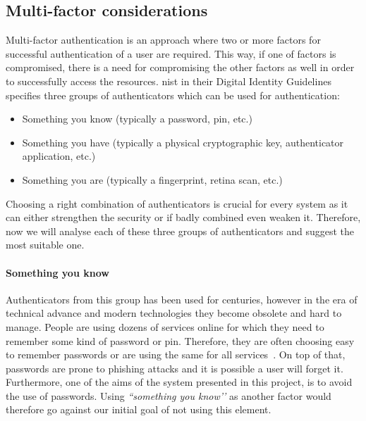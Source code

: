 \subsection{Multi-factor considerations} \label{multiFA}

Multi-factor authentication is an approach where two or more factors for successful authentication of a user are required. This way, if one of factors is compromised, there is a need for compromising the other factors as well in order to successfully access the resources. \acrshort{nist} in their Digital Identity Guidelines~\cite{Grassi2017Digital3} specifies three groups of authenticators which can be used for authentication:
\begin{itemize}[noitemsep]
    \item Something you know (typically a password, \acrshort{pin}, etc.)
    \item Something you have (typically a physical cryptographic key, authenticator application, etc.)
    \item Something you are (typically a fingerprint, retina scan, etc.)
\end{itemize}

Choosing a right combination of authenticators is crucial for every system as it can either strengthen the security or if badly combined even weaken it. Therefore, now we will analyse each of these three groups of authenticators and suggest the most suitable one.

\paragraph{Something you know}
Authenticators from this group has been used for centuries, however in the era of technical advance and modern technologies they become obsolete and hard to manage. People are using dozens of services online for which they need to remember some kind of password or \acrshort{pin}. Therefore, they are often choosing easy to remember passwords or are using the same for all services~\cite{2018OnlineSurvey}. On top of that, passwords are prone to phishing attacks and it is possible a user will forget it. Furthermore, one of the aims of the system presented in this project, is to avoid the use of passwords. Using\textit{ ``something you know’’} as another factor would therefore go against our initial goal of not using this element.

